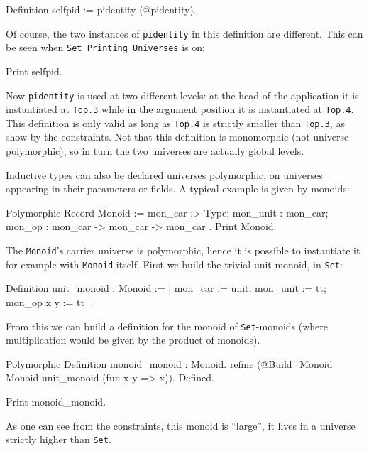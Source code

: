 \begin{coq_example}
Definition selfpid := pidentity (@pidentity).
\end{coq_example}

Of course, the two instances of \texttt{pidentity} in this definition
are different. This can be seen when \texttt{Set Printing Universes} is
on:

\begin{coq_example}
Print selfpid.
\end{coq_example}

Now \texttt{pidentity} is used at two different levels: at the head of
the application it is instantiated at \texttt{Top.3} while in the
argument position it is instantiated at \texttt{Top.4}. This definition
is only valid as long as \texttt{Top.4} is strictly smaller than
\texttt{Top.3}, as show by the constraints. Not that this definition is
monomorphic (not universe polymorphic), so in turn the two universes are
actually global levels.

Inductive types can also be declared universes polymorphic, on universes
appearing in their parameters or fields. A typical example is given by
monoids:

\begin{coq_example}
Polymorphic Record Monoid := { mon_car :> Type; mon_unit : mon_car; 
  mon_op : mon_car -> mon_car -> mon_car }.
Print Monoid.
\end{coq_example}

The \texttt{Monoid}'s carrier universe is polymorphic, hence it is
possible to instantiate it for example with \texttt{Monoid} itself.
First we build the trivial unit monoid, in \texttt{Set}:
\begin{coq_example}
Definition unit_monoid : Monoid := 
  {| mon_car := unit; mon_unit := tt; mon_op x y := tt |}.
\end{coq_example} 

From this we can build a definition for the monoid of
\texttt{Set}-monoids (where multiplication would be given by the product
of monoids).

\begin{coq_example*}
Polymorphic Definition monoid_monoid : Monoid.
  refine (@Build_Monoid Monoid unit_monoid (fun x y => x)).
Defined.
\end{coq_example*}
\begin{coq_example}
Print monoid_monoid.
\end{coq_example} 

As one can see from the constraints, this monoid is ``large'', it lives
in a universe strictly higher than \texttt{Set}.

